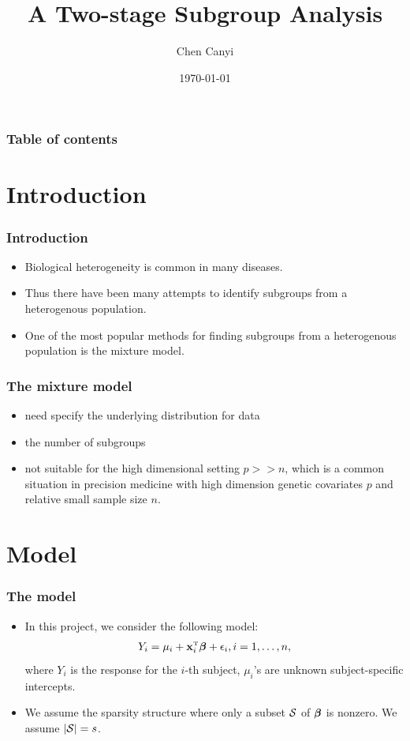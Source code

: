 \documentclass[hyperref={pdfpagelabels=false}]{beamer}
\title{A Two-stage Subgroup Analysis}
\author{Chen Canyi}
\date{\today}
\begin{document}
\begin{frame}
\titlepage
\end{frame} 


\begin{frame}
\frametitle{Table of contents}
\tableofcontents
\end{frame} 


\section{Introduction} 
\begin{frame}
	\frametitle{Introduction} 
	\begin{itemize}
		\item Biological heterogeneity is common in many diseases.
		\item Thus there have been many attempts to identify subgroups from a heterogenous population.
		\item One of the most popular methods for finding subgroups from a heterogenous population is the mixture model.
	\end{itemize}
\end{frame}

\begin{frame}
	\frametitle{The mixture model}
\begin{itemize}
	\item need specify the underlying distribution for data
	\item the number of subgroups
	\item not suitable for the high dimensional setting $p>>n$, which is a common situation in precision medicine with high dimension genetic covariates $p$ and relative small sample size $n$.
\end{itemize}
\end{frame}

\section{Model}

\begin{frame}
	\frametitle{The model}
\begin{itemize}
	\item 	In this project, we consider the following model:
	\begin{eqnarray*}
	Y_{i} = \mu_{i} + {\bf x}_{i}^{\mbox{\tiny{T}}}\bm{\beta} + \epsilon_{i}, i = 1,\ldots,n,
	\end{eqnarray*}
	where $Y_i$ is the response for the $i$-th subject, $\mu_i$'s are unknown subject-specific intercepts.
	\item We assume the sparsity structure where only a subset $\mathcal{S}$ of $\bm{\beta}$ is nonzero. We assume $|\mathcal{S}|=s$. 
\end{itemize}
\end{frame}
\end{document}
